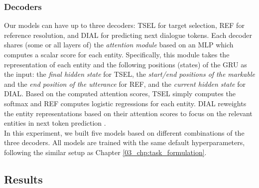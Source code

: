 
\subsubsection{Decoders}

Our models can have up to three decoders: TSEL for target selection, REF for reference resolution, and DIAL for predicting next dialogue tokens. Each decoder shares (some or all layers of) the \textit{attention module} based on an MLP which computes a scalar score for each entity. Specifically, this module takes the representation of each entity and the following positions (states) of the GRU as the input: the \textit{final hidden state} for TSEL, the \textit{start/end positions of the markable} and the \textit{end position of the utterance} for REF, and the \textit{current hidden state} for DIAL. Based on the computed attention scores, TSEL simply computes the softmax and REF computes logistic regressions for each entity. DIAL reweights the entity representations based on their attention scores to focus on the relevant entities in next token prediction \citep{bahdanau2014nmt,xu2015show}.\\

In this experiment, we built five models based on different combinations of the three decoders. All models are trained with the same default hyperparameters, following the similar setup as Chapter \ref{03_chp:task_formulation}.


\subsection{Results}
\label{04_subsec:results}

